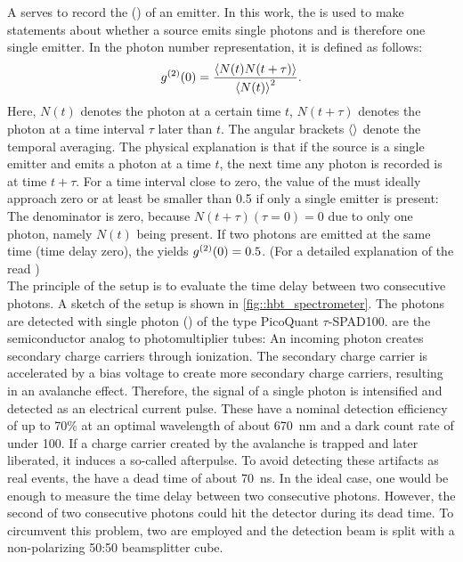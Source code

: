 		A  serves to record the  () of an emitter.
		In this work, the \gtf is used to make statements about whether a \pl source emits single photons and is therefore one single emitter.
		In the photon number representation, it is defined as follows:
		\[
		g^{(2)}(0) = \frac{ \left\langle  N(t) N(t+\tau) \right\rangle }{\left\langle N(t)\right\rangle^2}.
		\]
		Here, $N(t)$ denotes the photon at a certain time $t$, $N(t+\tau)$ denotes the photon at a time interval $\tau$ later than $t$.
		The angular brackets $\left\langle \right\rangle$ denote the temporal averaging.
		The physical explanation is  that if the source is a single emitter and emits a photon at a  time $t$, the next time any photon is recorded is at time $t+\tau$.
		For a time interval close to zero, the value of the \gtf must ideally approach zero or at least be smaller than \num{0.5} if only a single emitter is present:
		The denominator is zero, because $N(t + \tau) (\tau = 0)=0$ due to only one photon, namely $N(t)$ being present.
		If two photons are emitted at the same time (time delay zero), the \gtf yields $g^{(2)}(0)=0.5$. 
		(For a detailed explanation of the \gtf read \cite{Fox2006})
		\\
		The principle of the \hbt setup is to evaluate the time delay between two consecutive photons. 
		A sketch of the \hbt setup is shown in \autoref{fig::hbt_spectrometer}.
		The photons are detected with single photon \apds (\APDs) of the type PicoQuant $\tau${}-SPAD100.
		\APDs are the semiconductor analog to photomultiplier tubes:
		An incoming photon creates secondary charge carriers through ionization.
		The secondary charge carrier is accelerated by a bias voltage to create more secondary charge carriers, resulting in an avalanche effect.
		Therefore, the signal of a single photon is intensified and detected as an electrical current pulse.
		These \apds have a nominal detection efficiency of up to 70\% at an optimal wavelength of about \SI{670}{\nm} and a dark count rate of under \SI{100}{\cps}.
		If a charge carrier created by the avalanche is trapped and later liberated, it induces a so-called afterpulse.
		To avoid detecting these artifacts as real events, the \APDs have a dead time of about \SI{70}{\ns}.
		In the ideal case, one \APD would be enough to measure the time delay between two consecutive photons. 
		However, the second of two consecutive photons could hit the detector during its dead time.
		To circumvent this problem, two \APDs are employed and the detection beam is split with a non-polarizing 50:50 beamsplitter cube.
